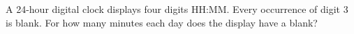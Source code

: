 A 24-hour digital clock displays four digits HH:MM. Every occurrence of digit 3 is blank. For how many minutes each day does the display have a blank?
